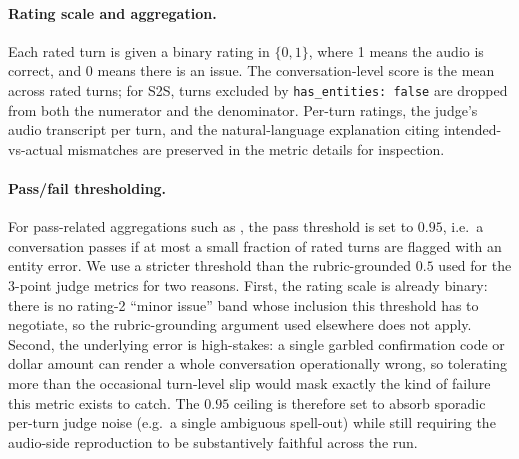 \paragraph{Rating scale and aggregation.} Each rated turn is given a binary rating in $\{0, 1\}$, where 1 means the audio is correct, and 0 means there is an issue. The conversation-level score is the mean across rated turns; for S2S, turns excluded by \texttt{has\_entities: false} are dropped from both the numerator and the denominator. Per-turn ratings, the judge's audio transcript per turn, and the natural-language explanation citing intended-vs-actual mismatches are preserved in the metric details for inspection.

\paragraph{Pass/fail thresholding.} For pass-related aggregations such as \passatk, the pass threshold is set to $0.95$, i.e.\ a conversation passes if at most a small fraction of rated turns are flagged with an entity error. We use a stricter threshold than the rubric-grounded $0.5$ used for the 3-point judge metrics for two reasons. First, the rating scale is already binary: there is no rating-2 ``minor issue'' band whose inclusion this threshold has to negotiate, so the rubric-grounding argument used elsewhere does not apply. Second, the underlying error is high-stakes: a single garbled confirmation code or dollar amount can render a whole conversation operationally wrong, so tolerating more than the occasional turn-level slip would mask exactly the kind of failure this metric exists to catch. The $0.95$ ceiling is therefore set to absorb sporadic per-turn judge noise (e.g.\ a single ambiguous spell-out) while still requiring the audio-side reproduction to be substantively faithful across the run.

